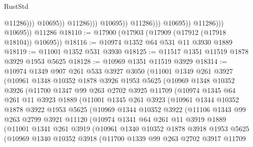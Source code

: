\begin{lexlean}{RustStd}
\begin{coremodule}
                                            @11286)))
                                      @10695))
                                  @11286)))
                            @10695))
                        @11286)))
                  @10695))
              @11286)))
        @10695))
    @11286
@18110 := @17900 (@17903 (@17909 (@17912 (@17918 @18104)) @10695))
@18116 := @10974 @1352 @64 @531 @11 @3930 @1889
@18119 := @11001 @1352 @531 @3930
@18125 := @11517 @1351 @11519 @1878 @3929 @1953 @5625
@18128 := @10969 @1351 @11519 @3929
@18314 := @10974
    @1349
    @907
    @261
    @533
    @3927
    @3050
    (@11001
      @1349
      @261
      @3927
      (@10961
        @1348
        @10352
        @1878
        @3926
        @1953
        @5625
        (@10969
          @1348
          @10352
          @3926
          (@11700
            @1347
            @99
            @263
            @2702
            @3925
            @11709
            (@10974
              @1345
              @64
              @261
              @11
              @3923
              @1889
              (@11001
                @1345
                @261
                @3923
                (@10961
                  @1344
                  @10352
                  @1878
                  @3922
                  @1953
                  @5625
                  (@10969
                    @1344
                    @10352
                    @3922
                    (@11106
                      @1343
                      @99
                      @263
                      @2799
                      @3921
                      @11120
                      (@10974
                        @1341
                        @64
                        @261
                        @11
                        @3919
                        @1889
                        (@11001
                          @1341
                          @261
                          @3919
                          (@10961
                            @1340
                            @10352
                            @1878
                            @3918
                            @1953
                            @5625
                            (@10969
                              @1340
                              @10352
                              @3918
                              (@11700
                                @1339
                                @99
                                @263
                                @2702
                                @3917
                                @11709

\end{coremodule}
\end{lexlean}
